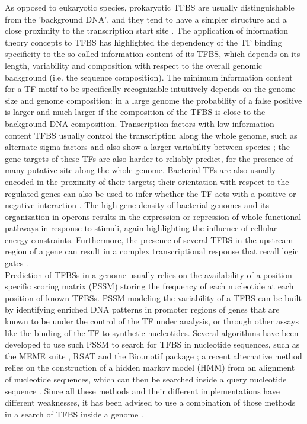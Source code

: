 As opposed to eukaryotic species, prokaryotic TFBS are usually distinguishable from the 'background DNA', and they tend to have a simpler structure and a close proximity to the transcription start site \cite{wunderlich2009different}. The application of information theory concepts to TFBS has highlighted the dependency of the TF binding specificity to the so called information content of its TFBS, which depends on its length, variability and composition with respect to the overall genomic background (i.e. the sequence composition). The minimum information content for a TF motif to be specifically recognizable intuitively depends on the genome size and genome composition: in a large genome the probability of a false positive is larger and much larger if the composition of the TFBS is close to the background DNA composition. Transcription factors with low information content TFBS usually control the transcription along the whole genome, such as alternate sigma factors and also show a larger variability between species \cite{quinn2014bacterial}; the gene targets of these TFs are also harder to reliably predict, for the presence of many putative site along the whole genome. Bacterial TFs are also usually encoded in the proximity of their targets; their orientation with respect to the regulated genes can also be used to infer whether the TF acts with a positive or negative interaction \cite{janga2007internal, westholm2008genome}. The high gene density of bacterial genomes and its organization in operons results in the expression or repression of whole functional pathways in response to stimuli, again highlighting the influence of cellular energy constraints. Furthermore, the presence of several TFBS in the upstream region of a gene can result in a complex transcriptional response that recall logic gates \cite{hunziker2010genetic}.\\
Prediction of TFBSs in a genome usually relies on the availability of a position specific scoring matrix (PSSM) storing the frequency of each nucleotide at each position of known TFBSs. PSSM modeling the variability of a TFBS can be built by identifying enriched DNA patterns in promoter regions of genes that are known to be under the control of the TF under analysis, or through other assays like the binding of the TF to synthetic nucleotides. Several algorithms have been developed to use such PSSM to search for TFBS in nucleotide sequences, such as the MEME suite \cite{bailey2009meme}, RSAT \cite{van2003regulatory, thomas2008rsat, thomas2011rsat} and the Bio.motif package \cite{cock2009biopython}; a recent alternative method relies on the construction of a hidden markov model (HMM) from an alignment of nucleotide sequences, which can then be searched inside a query nucleotide sequence \cite{eddy2009new, johnson2010hidden, eddy2011accelerated}. Since all these methods and their different implementations have different weaknesses, it has been advised to use a combination of those methods in a search of TFBS inside a genome \cite{harbison2004transcriptional}.\\ 
